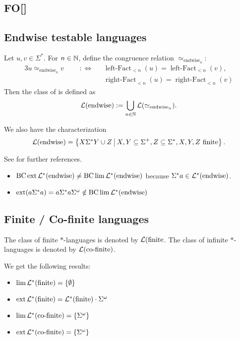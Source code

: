 \subsection{FO[]}

\subsection{Endwise testable languages}
\label{lang:endwise}
Let $u,v \in \Sigma^*$. For $n \in \mathbb{N}$, define the congruence relation $\simeq_{\text{endwise}_n}$:
\begin{alignat*}{3}
u \simeq_{\text{endwise}_n} v \ \ \ && :\Leftrightarrow \ \ \ & \operatorname{left-Fact}_{<n}(u) = \operatorname{left-Fact}_{<n}(v) , \\
&&& \operatorname{right-Fact}_{<n}(u) = \operatorname{right-Fact}_{<n}(v)
\end{alignat*}
Then the class of  is defined as
\[ \mathcal{L}(\textup{\textrm{endwise}}) := \bigcup_{n\in\mathbb{N}} \mathcal{L}(\simeq_{\text{endwise}_n}) . \]

We also have the characterization
\[ \Lang(\mathtext{endwise}) = \Set{X \Sigma^* Y \cup Z}{X,Y \subseteq \Sigma^+, Z \subseteq \Sigma^*, \text{$X,Y,Z$ finite}} . \]

See \cite[Section 2.4]{ConcHierR104} for further references.

\begin{itemize}
\item $\operatorname{BC} \operatorname{ext} \mathcal{L}^*(\textup{\textrm{endwise}}) \neq \operatorname{BC} \lim \mathcal{L}^*(\textup{\textrm{endwise}})$ because $\Sigma^*a \in \mathcal{L}^*(\textup{\textrm{endwise}})$.
\item $\operatorname{ext}(a\Sigma^* a) = a \Sigma^* a \Sigma^\omega \notin \operatorname{BC} \lim \mathcal{L}^*(\textup{\textrm{endwise}})$
\end{itemize}

\subsection{Finite / Co-finite languages}
\label{lang:finite}

The class of finite $*$-languages is denoted by $\mathcal{L}(\textup{\textrm{finite}}$. The class of infinite $*$-languages is denoted by $\mathcal{L}(\textup{\textrm{co-finite}})$.

We get the following results:
\begin{itemize}
\item $\lim \Lang^*(\mathtext{finite}) = \Set{\emptyset}$
\item $\operatorname{ext} \mathcal{L}^*(\textup{\textrm{finite}}) = \mathcal{L}^*(\textup{\textrm{finite}}) \cdot \Sigma^\omega$
\item $\lim \Lang^*(\mathtext{co-finite}) = \Set{\Sigma^\omega}$
\item $\ext \Lang^*(\mathtext{co-finite}) = \Set{\Sigma^\omega}$
\end{itemize}

